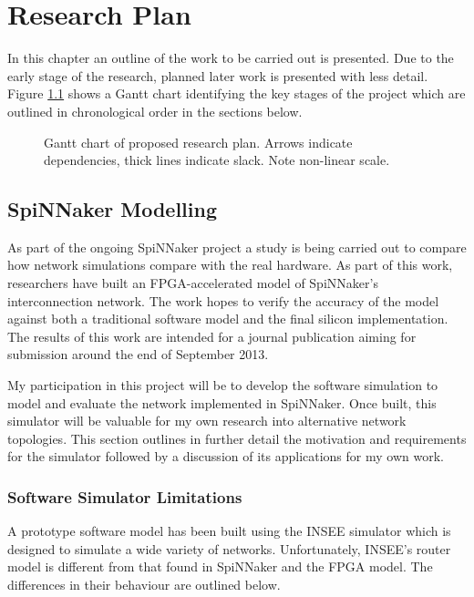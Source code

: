 \chapter{Research Plan}
	
	\label{sec:research-plan}
	
	In this chapter an outline of the work to be carried out is presented. Due to
	the early stage of the research, planned later work is presented with less
	detail.  Figure \ref{fig:plan-gantt} shows a Gantt chart identifying the key
	stages of the project which are outlined in chronological order in the
	sections below.
	
	\begin{figure}[b!]
		\center
		
		
		\caption[Research plan Gantt chart.]{Gantt chart of proposed research plan.
		Arrows indicate dependencies, thick lines indicate slack.  Note non-linear
		scale.}
		\label{fig:plan-gantt}
	\end{figure}
	
	
	\section{SpiNNaker Modelling}
		
		As part of the ongoing SpiNNaker project a study is being carried out to
		compare how network simulations compare with the real hardware. As part of
		this work, researchers have built an FPGA-accelerated model of SpiNNaker's
		interconnection network. The work hopes to verify the accuracy of the model
		against both a traditional software model and the final silicon
		implementation. The results of this work are intended for a journal
		publication aiming for submission around the end of September 2013.
		
		My participation in this project will be to develop the software simulation
		to model and evaluate the network implemented in SpiNNaker. Once built, this
		simulator will be valuable for my own research into alternative network
		topologies.  This section outlines in further detail the motivation and
		requirements for the simulator followed by a discussion of its applications
		for my own work.
		
		\subsection{Software Simulator Limitations}
		
			A prototype software model has been built using the INSEE simulator
			\cite{navaridas11insee} which is designed to simulate a wide variety of
			networks. Unfortunately, INSEE's router model is different from that found
			in SpiNNaker and the FPGA model. The differences in their behaviour are
			outlined below.
			
